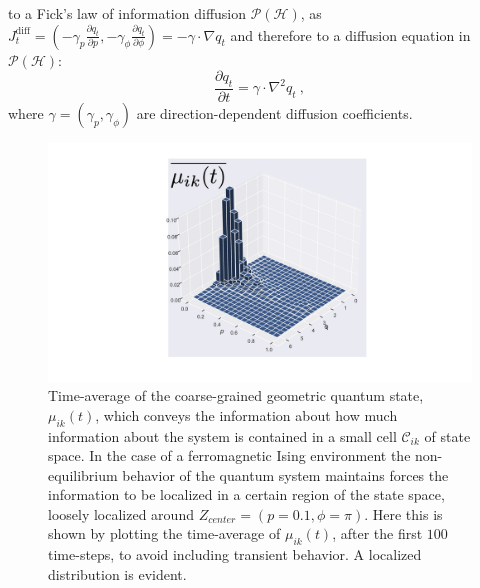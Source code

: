 \documentclass[draft,nofootinbib,pre,twocolumn,showpacs,showkeys,preprintnumbers,floatfix]{revtex4-1}
\newcommand{\CC}[2]{\mathcal{C}_{#1 #2}}
\newcommand{\1}{\mathbbm{1}}
\newcommand{\PH}{\mathcal{P}(\mathcal{H})}
\begin{document}
to a Fick's law of information diffusion $\PH$, as $J^{\mathrm{diff}}_t =  (-\gamma_p \frac{\partial q_t}{\partial p},-\gamma_\phi \frac{\partial q_t}{\partial \phi} ) = - \gamma \cdot \nabla q_t$
and therefore to a diffusion equation in $\PH$:
\begin{equation}
\frac{\partial q_t}{\partial t} =  \gamma \cdot \nabla^2 q_t~,
\end{equation}
where $\gamma = (\gamma_p,\gamma_\phi)$ are direction-dependent diffusion coefficients.
\begin{figure}[t!]
\centering
\includegraphics[width=.3\textwidth]{./img/mu_average.pdf}
\caption{Time-average of the coarse-grained geometric quantum 
state, $\mu_{ik}(t)$, which conveys the information about how much
information about the system is contained in a small cell $\CC{i}{k}$ of state space.
In the case of a ferromagnetic Ising environment the non-equilibrium behavior
of the quantum system maintains forces the information to be localized in a certain
region of the state space, loosely localized around $Z_{center}=(p=0.1,\phi = \pi)$.
Here this is shown by plotting the time-average of $\mu_{ik}(t)$, after the first
$100$ time-steps, to avoid including transient behavior. A localized distribution
is evident.
	}
\label{fig:mu_average}
\end{figure}
\end{document}
